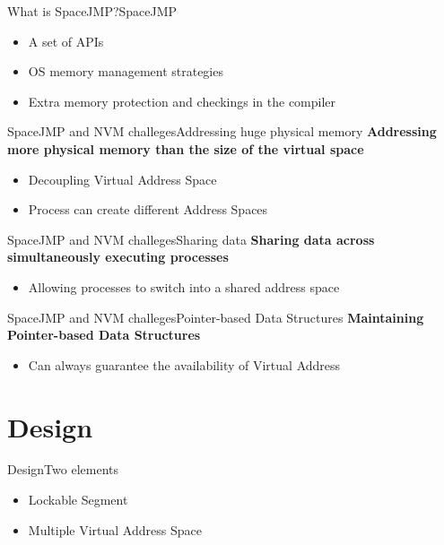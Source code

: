 \documentclass[10pt]{beamer}
\begin{document}
\begin{frame}{What is SpaceJMP?}{SpaceJMP}
  \begin{itemize}
    \item A set of APIs \pause
    \item OS memory management strategies \pause
    \item Extra memory protection and checkings in the compiler
  \end{itemize}
\end{frame}

\begin{frame}{SpaceJMP and NVM challeges}{Addressing huge physical memory}
  \textbf{Addressing more physical memory than the size of the virtual space}
  \pause
  \begin{itemize}
    \item Decoupling Virtual Address Space \pause
    \item Process can create different Address Spaces
  \end{itemize}
\end{frame}

\begin{frame}{SpaceJMP and NVM challeges}{Sharing data}
  \textbf{Sharing data across simultaneously executing processes}
  \pause
  \begin{itemize}
    \item Allowing processes to switch into a shared address space
  \end{itemize}
\end{frame}

\begin{frame}{SpaceJMP and NVM challeges}{Pointer-based Data Structures}
  \textbf{Maintaining Pointer-based Data Structures} \pause
  \begin{itemize}
    \item Can always guarantee the availability of Virtual Address
  \end{itemize}
\end{frame}

\section{Design}

\begin{frame}{Design}{Two elements}
  \begin{itemize}
    \item Lockable Segment
    \item Multiple Virtual Address Space
  \end{itemize}
\end{frame}
\end{document}
